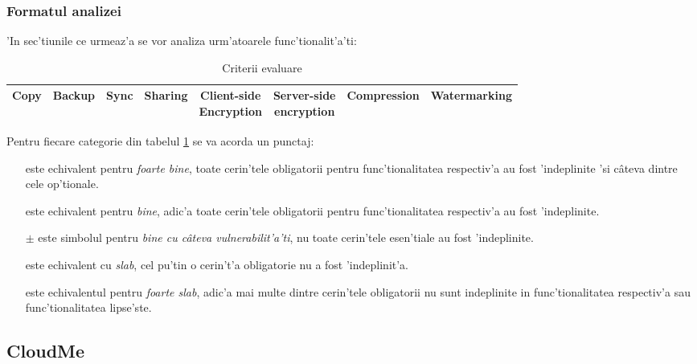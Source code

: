 \documentclass[12pt,a4paper,twoside]{report}
\newcommand{\greencheck}{\color{green}  \ding{51}}
\newcommand{\orangepm}{\color{orange} \textbf{$\pm$}}
\newcommand{\redxmark}{\color{red} \ding{55}}
\begin{document}
\subsubsection{Formatul analizei}
'In sec'tiunile ce urmeaz'a se vor analiza urm'atoarele func'tionalit'a'ti:

\begin{table}[H]
\caption{Criterii evaluare}
\begin{tabular}{|c|c|c|c|c|c|c|c|}          
\hline                     
Copy & Backup & Sync & Sharing & \makecell{Client-side \\ Encryption} & \makecell{ Server-side \\ encryption} & Compression & Watermarking  \\ [0.5ex]   
\hline                              
\end{tabular}
\label{table:criteriatable}             
\end{table}

Pentru fiecare categorie din tabelul \ref{table:criteriatable} se va acorda un punctaj:
\begin{itemize}
\item[\greencheck\greencheck] este echivalent pentru {\it foarte bine}, toate cerin'tele obligatorii pentru func'tionalitatea respectiv'a au fost 'indeplinite 'si câteva dintre cele op'tionale.
\item[\greencheck] este echivalent pentru {\it bine}, adic'a toate cerin'tele obligatorii pentru func'tionalitatea respectiv'a au fost 'indeplinite.
\item[\orangepm] este simbolul pentru {\it bine cu câteva vulnerabilit'a'ti}, nu toate cerin'tele esen'tiale au fost 'indeplinite.
\item[\redxmark] este echivalent cu {\it slab}, cel pu'tin o cerin't'a obligatorie nu a fost 'indeplinit'a.
\item[\redxmark \redxmark] este echivalentul pentru {\it foarte slab}, adic'a mai multe dintre cerin'tele obligatorii nu sunt indeplinite in func'tionalitatea respectiv'a sau func'tionalitatea lipse'ste.

\end{itemize}
\subsection{CloudMe}
\end{document}
